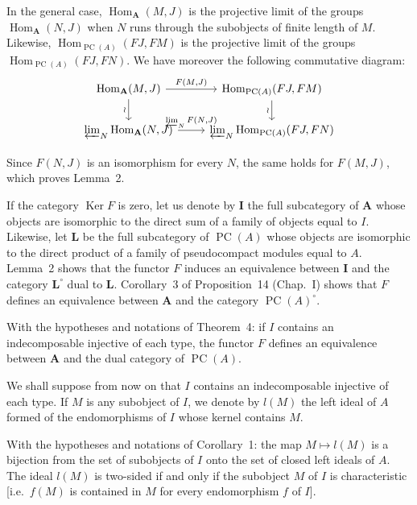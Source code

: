 In the general case, $\operatorname{Hom}_{\mathbf{A}}(M,J)$ is the
projective limit of the groups $\operatorname{Hom}_{\mathbf{A}}(N,J)$
when $N$ runs through the subobjects of finite length of $M$.
Likewise, $\operatorname{Hom}_{\operatorname{PC}(A)}(FJ,FM)$ is the
projective limit of the groups
$\operatorname{Hom}_{\operatorname{PC}(A)}(FJ,FN)$. We have moreover the
following commutative diagram:
\[
\begin{tikzcd}
\operatorname{Hom}_{\mathbf{A}}(M,J) \arrow[r, "F(M{,}J)"] \arrow[d, "\wr"'] & \operatorname{Hom}_{\operatorname{PC}(A)}(FJ,FM) \arrow[d, "\wr"'] \\
\varprojlim_N\operatorname{Hom}_{\mathbf{A}}(N,J) \arrow[r, "\varprojlim_N F(N{,}J)"] & \varprojlim_N\operatorname{Hom}_{\operatorname{PC}(A)}(FJ,FN)
\end{tikzcd}
\]

Since $F(N,J)$ is an isomorphism for every $N$, the same holds for
$F(M,J)$, which proves Lemma~2.

If the category $\operatorname{Ker}F$ is zero, let us denote by
$\mathbf{I}$ the full subcategory of $\mathbf{A}$ whose objects are
isomorphic to the direct sum of a family of objects equal to $I$.
Likewise, let $\mathbf{L}$ be the full subcategory of
$\operatorname{PC}(A)$ whose objects are isomorphic to the direct
product of a family of pseudocompact modules equal to $A$. Lemma~2
shows that the functor $F$ induces an equivalence between $\mathbf{I}$
and the category $\mathbf{L}^\circ$ dual to $\mathbf{L}$. Corollary~3
of Proposition~14 (Chap.~I) shows that $F$ defines an equivalence
between $\mathbf{A}$ and the category $\operatorname{PC}(A)^\circ$.

\begin{corollary}
With the hypotheses and notations of Theorem~4: if $I$ contains an
indecomposable injective of each type, the functor $F$ defines an
equivalence between $\mathbf{A}$ and the dual category of
$\operatorname{PC}(A)$.
\end{corollary}

We shall suppose from now on that $I$ contains an indecomposable
injective of each type. If $M$ is any subobject of $I$, we denote by
$l(M)$ the left ideal of $A$ formed of the endomorphisms of $I$ whose
kernel contains $M$.

\begin{corollary}
With the hypotheses and notations of Corollary~1: the map
$M\mapsto l(M)$ is a bijection from the set of subobjects of $I$ onto
the set of closed left ideals of $A$. The ideal $l(M)$ is two-sided if
and only if the subobject $M$ of $I$ is characteristic [i.e.\ $f(M)$
is contained in $M$ for every endomorphism $f$ of $I$].
\end{corollary}

